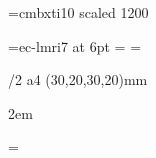 %
\def\tensingle{\baselineskip 11.50pt}
\def\tenonehalf{\baselineskip 17.32pt}
\def\tendouble{\baselineskip 23.14pt}

\def\twelvesingle{\baselineskip 13.84pt}
\def\twelveonehalf{\baselineskip 20.84pt}
\def\twelvedouble{\baselineskip 27.72pt}

\font\twelvebfit=cmbxti10 scaled 1200
\let\bfit=\twelvebfit

\font\sixit=ec-lmri7 at 6pt
\scriptfont\itfam=\eightit
\scriptscriptfont\itfam=\sixit


\def\Orange{\setcmykcolor{0 0.5 1 0}}
\def\Blue{\setcmykcolor{1 .43 0 0}}
\def\liBlue{\setcmykcolor{.2 .08 0 0}}
\def\liGrey{\setcmykcolor{0 0 0 0.13}}
\let\nBlue=\Blue 

\def\blackwhite{\let\Blue=\Grey \let\nBlue=\Black \let\Red=\Grey \let\liBlue=\liGrey}
\let\trysavetoner=\relax

\def\savetoner{\def\trysavetoner{%
  \ifx\drafttext\empty
     \message{WARNING: final (not \string\draft) version,
              \noexpand\savetoner ignored}
  \else
     \let\liBlue=\White
     \let\liGrey=\White %
  \fi 
}}

\hyperlinks{\Black}{\Black}
\def\tocborder{1 .8 0} 
\let\pgborder\tocborder
\let\citeborder\tocborder
\let\refborder\tocborder
\let\urlborder\tocborder

\ifx\localcolor\undefined  \let\locc=\relax \else \let\locc=\localcolor \fi



\margins/2 a4 (30,20,30,20)mm %

\emergencystretch 2em %
\hfuzz 0.3pt    
\vfuzz \hfuzz   

\parindent 1.5cm \iindent=\parindent %

